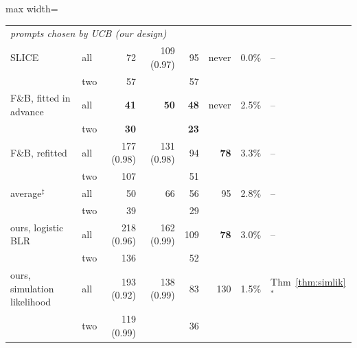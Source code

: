 \documentclass[11pt]{article}
\theoremstyle{remark}
\begin{document}
\begin{table}[t]
\begin{adjustbox}{max width=\textwidth}
\begin{tabular}{llrrrrrl}
\multicolumn{8}{l}{\emph{prompts chosen by UCB (our design)}} \\
SLICE & all & 72 & 109 (0.97) & 95 & never & 0.0\% & -- \\
 & two & 57 &  & 57 &  & & \\
\addlinespace[3pt]
F\&B, fitted in advance & all & \textbf{41} & \textbf{50} & \textbf{48} & never & 2.5\% & -- \\
 & two & \textbf{30} &  & \textbf{23} &  & & \\
\addlinespace[3pt]
F\&B, refitted & all & 177 (0.98) & 131 (0.98) & 94 & \textbf{78} & 3.3\% & -- \\
 & two & 107 &  & 51 &  & & \\
\addlinespace[3pt]
average$^\ddagger$ & all & 50 & 66 & 56 & 95 & 2.8\% & -- \\
 & two & 39 &  & 29 &  & & \\
\addlinespace[3pt]
ours, logistic BLR & all & 218 (0.96) & 162 (0.99) & 109 & \textbf{78} & 3.0\% & -- \\
 & two & 136 &  & 52 &  & & \\
\addlinespace[3pt]
ours, simulation likelihood & all & 193 (0.92) & 138 (0.99) & 83 & 130 & 1.5\% & Thm~\ref{thm:simlik}$^*$ \\
 & two & 119 (0.99) &  & 36 &  & & \\
\bottomrule
\end{tabular}
\end{adjustbox}
\end{table}
\end{document}
